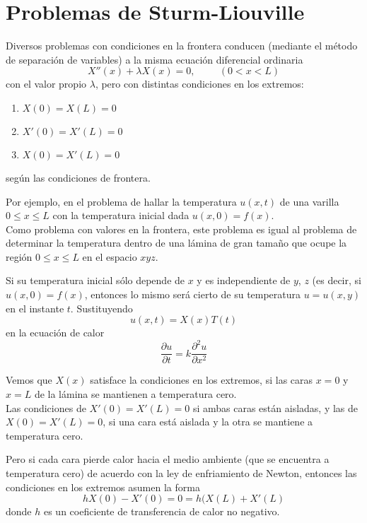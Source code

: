 \section{Problemas de Sturm-Liouville}
\begin{frame}
Diversos problemas con condiciones en la frontera conducen (mediante el m\'{e}todo de separaci\'{o}n de variables) a la misma ecuaci\'{o}n diferencial ordinaria
\[ X''(x) + \lambda X(x) = 0, \hspace{1cm} (0 < x < L)\]
con el valor propio $\lambda$, pero con distintas condiciones en los extremos:
\begin{enumerate}
\item $X(0) = X(L) = 0$
\item $X'(0) = X'(L) = 0$
\item $X(0) = X'(L) = 0$
\end{enumerate}
seg\'{u}n las condiciones de frontera.
\end{frame}
\begin{frame}
Por ejemplo, en el problema de hallar la temperatura $u(x,t)$ de una varilla $0 \leq x \leq L$ con la temperatura inicial dada $u(x,0)=f(x)$.
\\
\bigskip
Como problema con valores en la frontera, este problema es igual al problema de determinar la temperatura dentro de una l\'{a}mina de gran tamaño que ocupe la regi\'{o}n $0 \leq x \leq L$ en el espacio $xyz$.
\end{frame}
\begin{frame}
Si su temperatura inicial s\'{o}lo depende de $x$ y es independiente de $y$, $z$ (es decir, si $u(x,0)= f(x)$, entonces lo mismo ser\'{a} cierto de su temperatura $u=u(x,y)$ en el instante $t$. Sustituyendo
\[u(x,t) = X(x)T(t)\]
en la ecuaci\'{o}n de calor
\[ \dfrac{\partial u}{\partial t} = k \dfrac{\partial^{2} u}{\partial x^{2}}\]
\end{frame}
\begin{frame}
Vemos que $X(x)$ satisface la condiciones en los extremos, si las caras $x=0$ y $x=L$ de la l\'{a}mina se mantienen a temperatura cero.
\\
\bigskip
Las condiciones de $X'(0) = X'(L) = 0$ si ambas caras est\'{a}n aisladas, y las de $X(0) = X'(L) = 0$, si una cara est\'{a} aislada y la otra se mantiene a temperatura cero.
\end{frame}
\begin{frame}
Pero si cada cara pierde calor hacia el medio ambiente (que se encuentra a temperatura cero) de acuerdo con la ley de enfriamiento de Newton, entonces las condiciones en los extremos asumen la forma
\[h X(0) - X'(0) = 0 = h(X(L) + X'(L)\]
donde $h$ es un coeficiente de transferencia de calor no negativo.
\end{frame}
